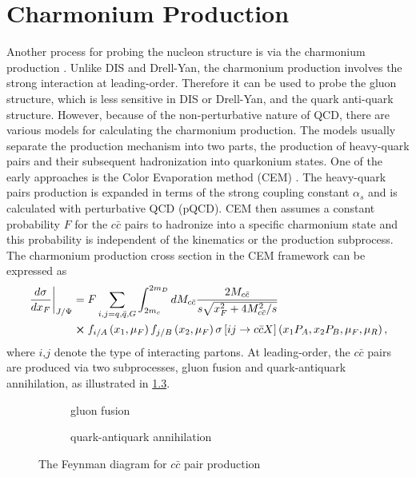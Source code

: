 \documentclass[../main.tex]{subfiles}
\begin{document}
\chapter{Charmonium Production}
\label{ch:jpsi}
Another process for probing the nucleon structure is via the charmonium production \cite{peng1995,chang2020}.
Unlike DIS and Drell-Yan, the charmonium production involves the strong interaction
at leading-order. Therefore it can be used to probe the gluon structure, which is
less sensitive in DIS or Drell-Yan, and the quark anti-quark structure. However,
because of the non-perturbative nature of QCD, there are various models for
calculating the charmonium production. The models usually separate the production
mechanism into two parts, the production of heavy-quark pairs and their subsequent
hadronization into quarkonium states. One of the early approaches is the Color
Evaporation method (CEM) \cite{einhorn1975,bodwin1995,bodwin1997}. The heavy-quark
pairs production is expanded in terms of the strong coupling constant $\alpha_s$
and is calculated with perturbative QCD (pQCD). CEM then assumes a constant
probability $F$ for the $c\bar{c}$ pairs to hadronize into a specific charmonium
state and this probability is independent of the kinematics or the production
subprocess. The charmonium production cross section in the CEM framework can be
expressed as
\begin{equation}
	\begin{split}
		\left.\frac{d\sigma}{dx_F}\right|_{J/\Psi} &= F \sum_{i,j = q,\bar{q},G}\int^{2m_D}_{2m_c} dM_{c\bar{c}}  \frac{2M_{c\bar{c}}}{s\sqrt{x_F^2+4M_{c\bar{c}}^2/s}}\\
		&\cross f_{i/A}\left(x_1,\mu_F\right)f_{j/B}\left(x_2,\mu_F\right)\sigma\left[ij\rightarrow c\bar{c}X\right]\left(x_1P_A,x_2P_B,\mu_F,\mu_R \right),
	\end{split}
\end{equation}
where $i$,$j$ denote the type of interacting partons. At leading-order, the
$c\bar{c}$ pairs are produced via two subprocesses, gluon fusion and
quark-antiquark annihilation, as illustrated in \cref{fig:charmonium}.
\begin{figure}[htpb!]
	\centering
	\begin{subfigure}{0.4\linewidth}
		\begin{subfigure}{\linewidth}
			
		\end{subfigure}
		\begin{subfigure}{\linewidth}
			
		\end{subfigure}
		\caption{gluon fusion\label{subfig:gluon}}
	\end{subfigure}
	\quad
	\begin{subfigure}{0.4\linewidth}
		
		\caption{quark-antiquark annihilation\label{subfig:qqbar}}
	\end{subfigure}
	\caption{The Feynman diagram for $c\bar{c}$ pair production}
	\label{fig:charmonium}
\end{figure}
\end{document}
